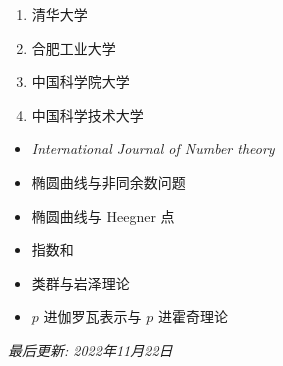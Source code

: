 \documentclass[11pt,a4paper]{article}
\begin{document}
\begin{enumerate}
\item 清华大学
  \begin{enumerate}
  \end{enumerate}
\item 合肥工业大学
  \begin{enumerate}
  \end{enumerate}
\item 中国科学院大学
  \begin{enumerate}
  \end{enumerate}
\item 中国科学技术大学
  \begin{enumerate}
  \end{enumerate}
\end{enumerate}


\begin{itemize}
\item {\em International Journal of Number theory}
\end{itemize}


\begin{itemize}
\item 椭圆曲线与非同余数问题
\item 椭圆曲线与 Heegner 点
\item 指数和
\item 类群与岩泽理论
\item $p$ 进伽罗瓦表示与 $p$ 进霍奇理论
\end{itemize}


\medskip\emph{最后更新: 2022年11月22日}
\end{document}
